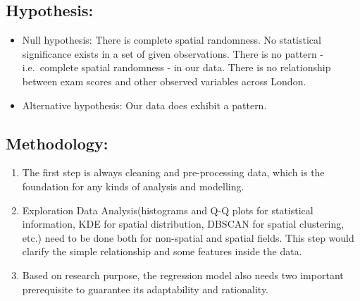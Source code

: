 \documentclass[
]{article}
\providecommand{\tightlist}{%
  \setlength{\itemsep}{0pt}\setlength{\parskip}{0pt}}
\begin{document}
\hypertarget{hypothesis}{%
\subsection{Hypothesis:}\label{hypothesis}}

\begin{itemize}
\tightlist
\item
  Null hypothesis: There is complete spatial randomness. No statistical
  significance exists in a set of given observations. There is no
  pattern - i.e.~complete spatial randomness - in our data. There is no
  relationship between exam scores and other observed variables across
  London.
\item
  Alternative hypothesis: Our data does exhibit a pattern.
\end{itemize}

\hypertarget{methodology}{%
\subsection{Methodology:}\label{methodology}}

\begin{enumerate}
\def\labelenumi{\arabic{enumi}.}
\item
  The first step is always cleaning and pre-processing data, which is
  the foundation for any kinds of analysis and modelling.
\item
  Exploration Data Analysis(histograms and Q-Q plots for statistical
  information, KDE for spatial distribution, DBSCAN for spatial
  clustering, etc.) need to be done both for non-spatial and spatial
  fields. This step would clarify the simple relationship and some
  features inside the data.
\item
  Based on research purpose, the regression model also needs two
  important prerequisite to guarantee its adaptability and rationality.
\end{enumerate}
\end{document}
